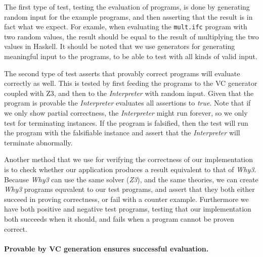 The first type of test, testing the evaluation of programs, is done by generating random input for the example programs, and then asserting that the result is in fact what we expect.
For examle, when evaluating the \texttt{mult.ifc} program with two random values, the result should be equal to the result of multiplying the two values in Haskell.
It should be noted that we use generators for generating meaningful input to the programs, to be able to test with all kinds of valid input.

The second type of test asserts that provably correct programs will evaluate correctly as well.
This is tested by first feeding the programs to the VC generator coupled with Z3, and then to the \textit{Interpreter} with random input.
Given that the program is provable the \textit{Interpreter} evaluates all assertions to \textit{true}.
Note that if we only show partial correctness, the \textit{Interpreter} might run forever, so we only test for terminating instances.
If the program is falsified, then the test will run the program with the falsifiable instance and assert that the \textit{Interpreter} will terminate abnormally.

Another method that we use for verifying the correctness of our implementation is to check whether our application produces a result equivalent to that of \textit{Why3}.
Because \textit{Why3} can use the same solver (\textit{Z3}), and the same theories, we can create \textit{Why3} programs equvalent to our test programs, and assert that they both either succeed in proving correctness, or fail with a counter example.
Furthermore we have both positive and negative test programs, testing that our implementation both succeeds when it should, and fails when a program cannot be proven correct.

\paragraph{Provable by VC generation ensures successful evaluation.}

